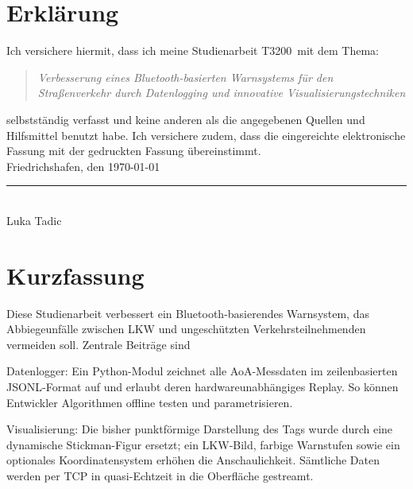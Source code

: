 \documentclass[a4paper, 12pt]{article} %
\newcommand{\titel}{Verbesserung eines Bluetooth-basierten Warnsystems für den Straßenverkehr durch Datenlogging und innovative Visualisierungstechniken}
\newcommand{\arbeit}{Studienarbeit T3200}
\newcommand{\autor}{Luka Tadic}
\begin{document}
\begin{titlepage}
\end{titlepage}

\clearpage

\pagestyle{scrheadings}  %
\hypersetup{pageanchor=true}



\section*{Erklärung}

Ich versichere hiermit, dass ich meine \arbeit\ mit dem Thema:

\begin{quote}
    \textit{\titel}
\end{quote}

selbstständig verfasst und keine anderen als die angegebenen Quellen und Hilfsmittel benutzt habe.  
Ich versichere zudem, dass die eingereichte elektronische Fassung mit der gedruckten Fassung übereinstimmt.\\[6ex]

Friedrichshafen, den \today \\[1ex]
\rule[-0.2cm]{5cm}{0.5pt} \\  
\autor \\[10ex]

\rmfamily


\clearpage

\section*{Kurzfassung}

Diese Studienarbeit verbessert ein Bluetooth-basierendes Warnsystem, das Abbiege­unfälle zwischen \ac{LKW} und ungeschützten Verkehrs­teilnehmenden 
vermeiden soll.
Zentrale Beiträge sind

Datenlogger: Ein Python-Modul zeichnet alle \acs{AoA}-Messdaten im zeilenbasierten \ac{JSONL}-Format auf und erlaubt deren hardware­unabhängiges Replay. 
So können Entwickler Algorithmen offline testen und parametrisieren.

Visualisierung: Die bisher punktförmige Darstellung des Tags wurde durch eine dynamische Stickman-Figur ersetzt; ein \ac{LKW}-Bild, farbige 
Warnstufen sowie ein optionales Koordinaten­system erhöhen die Anschaulichkeit. Sämtliche Daten werden per \acs{TCP} in quasi-Echtzeit in die Oberfläche 
gestreamt.
\end{document}
